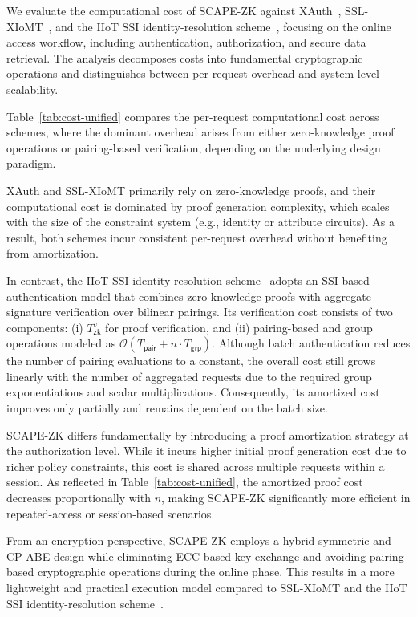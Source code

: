 \documentclass[conference]{IEEEtran}
\begin{document}
We evaluate the computational cost of SCAPE-ZK against XAuth~\cite{b6}, SSL-XIoMT~\cite{b8}, and the IIoT SSI identity-resolution scheme~\cite{b30}, focusing on the online access workflow, including authentication, authorization, and secure data retrieval. The analysis decomposes costs into fundamental cryptographic operations and distinguishes between per-request overhead and system-level scalability.




Table~\ref{tab:cost-unified} compares the per-request computational cost across schemes, where the dominant overhead arises from either zero-knowledge proof operations or pairing-based verification, depending on the underlying design paradigm.

XAuth and SSL-XIoMT primarily rely on zero-knowledge proofs, and their computational cost is dominated by proof generation complexity, which scales with the size of the constraint system (e.g., identity or attribute circuits). As a result, both schemes incur consistent per-request overhead without benefiting from amortization.

In contrast, the IIoT SSI identity-resolution scheme~\cite{b30} adopts an SSI-based authentication model that combines zero-knowledge proofs with aggregate signature verification over bilinear pairings. Its verification cost consists of two components: (i) $T_{\mathsf{zk}}^{v}$ for proof verification, and (ii) pairing-based and group operations modeled as $\mathcal{O}(T_{\mathsf{pair}} + n \cdot T_{\mathsf{grp}})$. Although batch authentication reduces the number of pairing evaluations to a constant, the overall cost still grows linearly with the number of aggregated requests due to the required group exponentiations and scalar multiplications. Consequently, its amortized cost improves only partially and remains dependent on the batch size.

SCAPE-ZK differs fundamentally by introducing a proof amortization strategy at the authorization level. While it incurs higher initial proof generation cost due to richer policy constraints, this cost is shared across multiple requests within a session. As reflected in Table~\ref{tab:cost-unified}, the amortized proof cost decreases proportionally with $n$, making SCAPE-ZK significantly more efficient in repeated-access or session-based scenarios.

From an encryption perspective, SCAPE-ZK employs a hybrid symmetric and CP-ABE design while eliminating ECC-based key exchange and avoiding pairing-based cryptographic operations during the online phase. This results in a more lightweight and practical execution model compared to SSL-XIoMT and the IIoT SSI identity-resolution scheme~\cite{b30}.
\end{document}
